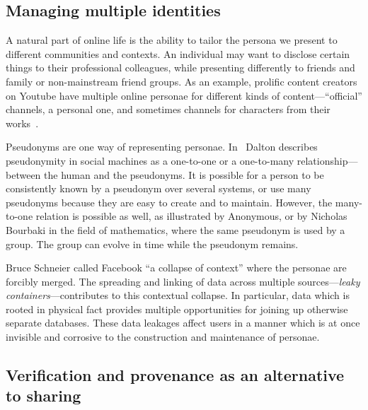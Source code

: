 \documentclass{IOS-Book-Article}     %
\newcommand{\tbox}[3][red]{{
\color{#1}\noindent{
   \fbox{\scriptsize{ {\bf #2} \textsl{#3}}}
   \vspace{2pt}
}
}}
\newcommand{\todo}[1]{\tbox{TODO:}{#1}}
\begin{document}



\subsection{Managing multiple identities}

A natural part of online life is the ability to tailor the persona we present to
different communities and contexts. An individual may want to disclose certain
things to their professional colleagues, while presenting differently to friends
and family or non-mainstream friend groups. 
As an example, prolific content creators on Youtube have multiple online
personae for different kinds of content---``official'' channels, a personal one,
and sometimes channels for characters from their works~\cite{guy2014ConstructedIdentity}.

Pseudonyms are one way of representing personae. In~\cite{dalton2013Pseudonymity} 
Dalton describes pseudonymity in social machines as
a one-to-one or a one-to-many relationship---between the human and the
pseudonyms. It is possible for a person to be consistently known by a pseudonym
over several systems, or use many pseudonyms because they are easy to create and
to maintain. However, the many-to-one relation is possible as well, as
illustrated by Anonymous, or by Nicholas Bourbaki in the field of mathematics,
where the same pseudonym is used by a group. The group can evolve in time while
the pseudonym remains. 

Bruce Schneier called Facebook ``a collapse of context'' where the personae are
forcibly merged. The spreading and linking of data across multiple
sources---\emph{leaky containers}---contributes to this contextual collapse.
In particular, data which is rooted in physical fact provides multiple
opportunities for joining up otherwise separate databases. 
These data leakages affect users in a manner which is at once invisible and
corrosive to the construction and maintenance of personae.

\subsection{Verification and provenance as an alternative to sharing}
\label{sec:verification}
\end{document}
